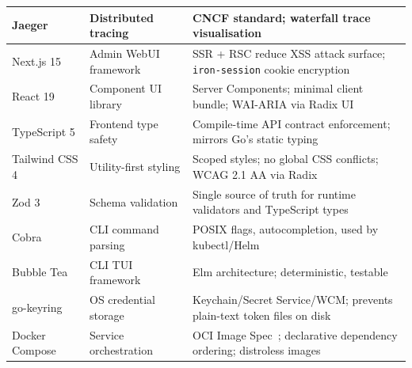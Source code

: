 \begin{longtable}{|p{2.6cm}|p{3.2cm}|p{9.5cm}|}
\hline
Jaeger & Distributed tracing & CNCF standard; waterfall trace visualisation \\
\hline
Next.js 15 & Admin WebUI framework & SSR + RSC reduce XSS attack surface; \texttt{iron-session} cookie encryption~\cite{nextjs-docs} \\
\hline
React 19 & Component UI library & Server Components; minimal client bundle; WAI-ARIA via Radix UI~\cite{wai-aria} \\
\hline
TypeScript 5 & Frontend type safety & Compile-time API contract enforcement; mirrors Go's static typing~\cite{typescript-docs} \\
\hline
Tailwind CSS 4 & Utility-first styling & Scoped styles; no global CSS conflicts; WCAG 2.1 AA via Radix~\cite{tailwind-docs} \\
\hline
Zod 3 & Schema validation & Single source of truth for runtime validators and TypeScript types \\
\hline
Cobra & CLI command parsing & POSIX flags, autocompletion, used by kubectl/Helm~\cite{cobra-docs} \\
\hline
Bubble Tea & CLI TUI framework & Elm architecture; deterministic, testable~\cite{bubbletea-docs} \\
\hline
go-keyring & OS credential storage & Keychain/Secret Service/WCM; prevents plain-text token files on disk \\
\hline
Docker Compose & Service orchestration & OCI Image Spec~\cite{oci-spec}; declarative dependency ordering; distroless images \\
\hline
\end{longtable}
\renewcommand{\arraystretch}{1}
